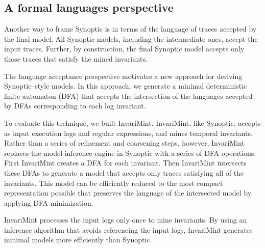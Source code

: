 \subsection{A formal languages perspective}

Another way to frame Synoptic is in terms of the language of
traces accepted by the final model.
All Synoptic models, including the intermediate ones,
accept the input traces.
Further, by construction, the final Synoptic model accepts only those
traces that satisfy the mined invariants.

The language acceptance perspective motivates a new approach for deriving
Synoptic--style models. In this approach, we generate a minimal
deterministic finite automaton (DFA) that accepts the
intersection of the languages accepted by DFAs corresponding to each log
invariant.

To evaluate this technique, we built InvariMint. InvariMint, like Synoptic,
accepts as input execution logs and regular expressions, and mines 
temporal invariants. Rather than a series of refinement and
coarsening steps, however, InvariMint replaces the model inference engine in
Synoptic with a series of DFA operations. First InvariMint creates a DFA 
for each invariant. Then InvariMint intersects these DFAs to generate a model that
accepts only traces satisfying all of the invariants.
This model can be efficiently
reduced to the
most compact representation possible that preserves the
language of the intersected model by applying DFA minimization.

InvariMint processes the input logs only once to mine invariants.
By using an inference algorithm that avoids referencing the input logs, InvariMint
generates minimal models more efficiently than Synoptic.

